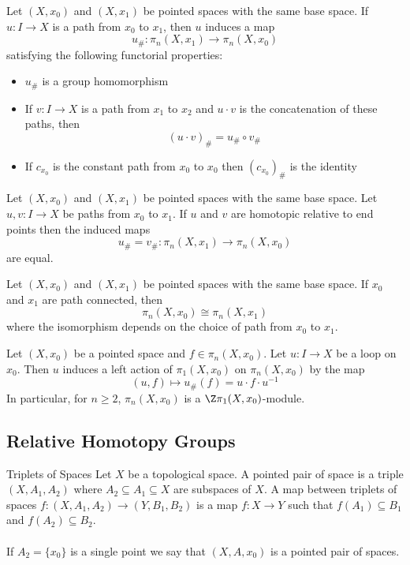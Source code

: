 \documentclass[a4paper]{article}
\begin{document}
\begin{thm}{}{} Let $(X,x_0)$ and $(X,x_1)$ be pointed spaces with the same base space. If $u:I\to X$ is a path from $x_0$ to $x_1$, then $u$ induces a map $$u_\#:\pi_n(X,x_1)\to\pi_n(X,x_0)$$ satisfying the following functorial properties: 
\begin{itemize}
\item $u_\#$ is a group homomorphism
\item If $v:I\to X$ is a path from $x_1$ to $x_2$ and $u\cdot v$ is the concatenation of these paths, then $$(u\cdot v)_\#=u_\#\circ v_\#$$
\item If $c_{x_0}$ is the constant path from $x_0$ to $x_0$ then $(c_{x_0})_\#$ is the identity
\end{itemize}
\end{thm}

\begin{prp}{}{} Let $(X,x_0)$ and $(X,x_1)$ be pointed spaces with the same base space. Let $u,v:I\to X$ be paths from $x_0$ to $x_1$. If $u$ and $v$ are homotopic relative to end points then the induced maps $$u_\#=v_\#:\pi_n(X,x_1)\to\pi_n(X,x_0)$$ are equal. 
\end{prp}

\begin{crl}{}{} Let $(X,x_0)$ and $(X,x_1)$ be pointed spaces with the same base space. If $x_0$ and $x_1$ are path connected, then $$\pi_n(X,x_0)\cong\pi_n(X,x_1)$$ where the isomorphism depends on the choice of path from $x_0$ to $x_1$. 
\end{crl}

\begin{prp}{}{} Let $(X,x_0)$ be a pointed space and $f\in\pi_n(X,x_0)$. Let $u:I\to X$ be a loop on $x_0$. Then $u$ induces a left action of $\pi_1(X,x_0)$ on $\pi_n(X,x_0)$ by the map $$(u,f)\mapsto u_\#(f)=u\cdot f\cdot u^{-1}$$ In particular, for $n\geq 2$, $\pi_n(X,x_0)$ is a $\Z\pi_1(X,x_0)$-module. 
\end{prp}

\subsection{Relative Homotopy Groups}
\begin{defn}{Triplets of Spaces}{} Let $X$ be a topological space. A pointed pair of space is a triple $(X,A_1,A_2)$ where $A_2\subseteq A_1\subseteq X$ are subspaces of $X$. A map between triplets of spaces $f:(X,A_1,A_2)\to(Y,B_1,B_2)$ is a map $f:X\to Y$ such that $f(A_1)\subseteq B_1$ and $f(A_2)\subseteq B_2$. \\~\\
If $A_2=\{x_0\}$ is a single point we say that $(X,A,x_0)$ is a pointed pair of spaces. 
\end{defn}
\end{document}
